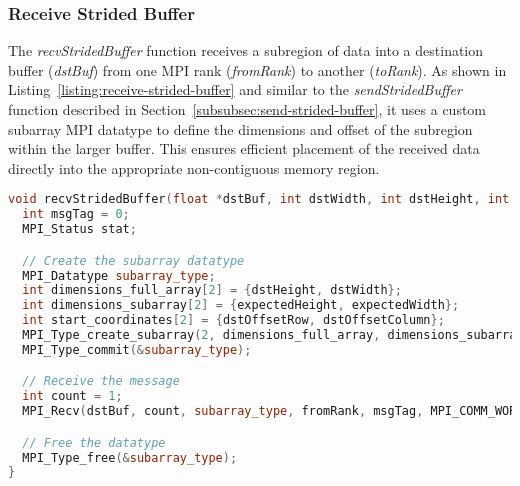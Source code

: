\subsubsection{Receive Strided Buffer}
\label{subsubsec:receive-strided-buffer}

The \textit{recvStridedBuffer} function receives a subregion of data into a destination buffer (\textit{dstBuf}) from one MPI rank (\textit{fromRank}) to another (\textit{toRank}). As shown in Listing~\ref{listing:receive-strided-buffer} and similar to the \textit{sendStridedBuffer} function described in Section~\ref{subsubsec:send-strided-buffer}, it uses a custom subarray MPI datatype to define the dimensions and offset of the subregion within the larger buffer. This ensures efficient placement of the received data directly into the appropriate non-contiguous memory region.

\begin{lstlisting}[caption={\textbf{Implementation of the receive strided buffer function.}},label={listing:receive-strided-buffer},float=htbp,style=mystyle,language=C++]
void recvStridedBuffer(float *dstBuf, int dstWidth, int dstHeight, int dstOffsetColumn, int dstOffsetRow, int expectedWidth, int expectedHeight, int fromRank, int toRank) {
  int msgTag = 0;
  MPI_Status stat;

  // Create the subarray datatype
  MPI_Datatype subarray_type;
  int dimensions_full_array[2] = {dstHeight, dstWidth};
  int dimensions_subarray[2] = {expectedHeight, expectedWidth};
  int start_coordinates[2] = {dstOffsetRow, dstOffsetColumn};
  MPI_Type_create_subarray(2, dimensions_full_array, dimensions_subarray, start_coordinates, MPI_ORDER_C, MPI_FLOAT, &subarray_type);
  MPI_Type_commit(&subarray_type);

  // Receive the message
  int count = 1;
  MPI_Recv(dstBuf, count, subarray_type, fromRank, msgTag, MPI_COMM_WORLD, &stat);

  // Free the datatype
  MPI_Type_free(&subarray_type);
}
\end{lstlisting}
